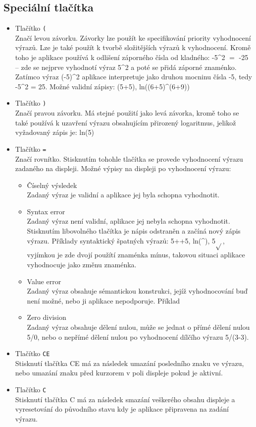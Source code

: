 \documentclass[a4paper, 11pt]{article}
\begin{document}
\subsection{Speciální tlačítka}
\begin{itemize}
\item Tlačítko \texttt{(}\\Značí levou závorku. Závorky lze použít ke specifikování priority vyhodnocení výrazů. Lze je také použít k tvorbě složitějších výrazů k vyhodnocení. Kromě toho je aplikace používá k odlišení záporného čísla od kladného: -5\string^2 $=$ -25 -- zde se nejprve vyhodnotí výraz 5\string^2 a poté se přidá záporné znaménko. Zatímco výraz (-5)\string^2 aplikace interpretuje jako druhou mocninu čísla -5, tedy -5\string^2 = 25. Možné validní zápisy: (5+5), ln((6+5)\string^(6+9))
\item Tlačítko \texttt{)}\\Značí pravou závorku. Má stejné použití jako levá závorka, kromě toho se také používá k uzavření výrazu obsahujícím přirozený logaritmus, jelikož vyžadovaný zápis je: ln(5)
\item Tlačítko \texttt{=}\\Značí rovnítko. Stisknutím tohohle tlačítka se provede vyhodnocení výrazu zadaného na displeji. Možné výpisy na displeji po vyhodnocení výrazu:
\begin{itemize}
\item Číselný výsledek\\Zadaný výraz je validní a aplikace jej byla schopna vyhodnotit.
\item Syntax error\\Zadaný výraz není validní, aplikace jej nebyla schopna vyhodnotit. Stisknutím libovolného tlačítka je nápis odstraněn a začíná nový zápis výrazu. Příklady syntaktický špatných výrazů: 5++5, ln(\string^), 5$\sqrt{}$, vyjímkou je zde dvojí použítí znaménka mínus, takovou situaci aplikace vyhodnocuje jako změnu znaménka.
\item Value error\\Zadaný výraz obsahuje sémantickou konstrukci, jejíž vyhodnocování buď není možné, nebo ji aplikace nepodporuje. Příklad
\item Zero division\\Zadaný výraz obsahuje dělení nulou, může se jednat o přímé dělení nulou 5/0, nebo o nepřímé dělení nulou po vyhodnocení dílčího výrazu 5/(3-3).
\end{itemize}
\item Tlačítko \texttt{CE}\\Stisknutí tlačítka CE má za následek umazání posledního znaku ve výrazu, nebo umazání znaku před kurzorem v poli displeje pokud je aktivní.
\item Tlačítko \texttt{C}\\Stisknutí tlačítka C má za následek smazání veškerého obsahu displeje a vyresetování do původního stavu kdy je aplikace připravena na zadání výrazu. 
\end{itemize}
\end{document}
